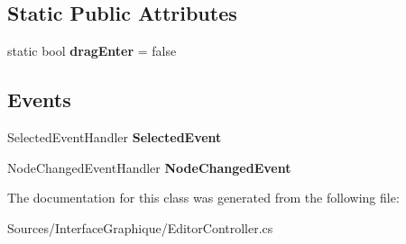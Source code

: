 \subsection*{Static Public Attributes}
\begin{DoxyCompactItemize}
\item 
\hypertarget{class_interface_graphique_1_1_editor_controller_a82feebbd903c444d0b619af07f099a91}{}static bool {\bfseries drag\+Enter} = false\label{class_interface_graphique_1_1_editor_controller_a82feebbd903c444d0b619af07f099a91}

\end{DoxyCompactItemize}
\subsection*{Events}
\begin{DoxyCompactItemize}
\item 
\hypertarget{class_interface_graphique_1_1_editor_controller_aea88c2e37d91b453d2a5190c6188610b}{}Selected\+Event\+Handler {\bfseries Selected\+Event}\label{class_interface_graphique_1_1_editor_controller_aea88c2e37d91b453d2a5190c6188610b}

\item 
\hypertarget{class_interface_graphique_1_1_editor_controller_a032b24e2dbb8d2497cd5288c235c455d}{}Node\+Changed\+Event\+Handler {\bfseries Node\+Changed\+Event}\label{class_interface_graphique_1_1_editor_controller_a032b24e2dbb8d2497cd5288c235c455d}

\end{DoxyCompactItemize}


The documentation for this class was generated from the following file\+:\begin{DoxyCompactItemize}
\item 
Sources/\+Interface\+Graphique/Editor\+Controller.\+cs\end{DoxyCompactItemize}
